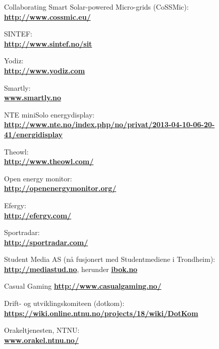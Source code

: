 \begin{thebibliography}{1}

 Collaborating Smart Solar-powered Micro-grids (CoSSMic):\\ \textbf{\url{http://www.cossmic.eu/}}

 SINTEF: \\
\textbf{ \url{ http://www.sintef.no/sit}}

 Yodiz: \\
\textbf{ \url{ http://www.yodiz.com}}
        
 Smartly: \\
\textbf{ \url{www.smartly.no}}

 NTE miniSolo energydisplay:\\
\textbf{ \url{http://www.nte.no/index.php/no/privat/2013-04-10-06-20-41/energidisplay}}

 Theowl:\\
\textbf{ \url{http://www.theowl.com/}}

 Open energy monitor:\\
\textbf{ \url{http://openenergymonitor.org/}}

 Efergy:\\
\textbf{ \url{http://efergy.com/}}

 Sportradar:\\
\textbf{ \url{http://sportradar.com/}}

 Student Media AS (nå fusjonert med Studentmediene i Trondheim):\\
\textbf{ \url{http://mediastud.no}}, herunder \textbf{ \url{ibok.no}}

 Casual Gaming
\textbf{ \url{http://www.casualgaming.no/}}

 Drift- og utviklingskomiteen (dotkom):\\
\textbf{ \url{https://wiki.online.ntnu.no/projects/18/wiki/DotKom}}

 Orakeltjenesten, NTNU:\\
\textbf{ \url{www.orakel.ntnu.no/‎}}


\end{thebibliography}
